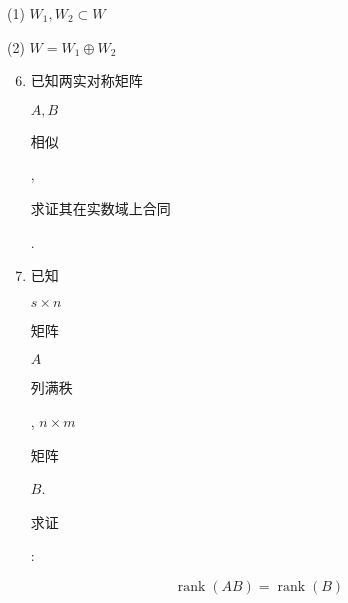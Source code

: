 \documentclass[10pt]{article}
\begin{document}
(1) $W_{1}, W_{2} \subset W$

(2) $W=W_{1} \oplus W_{2}$

\begin{enumerate}
  \setcounter{enumi}{5}
  \item \begin{CJK}{UTF8}{mj}已知两实对称矩阵\end{CJK} $A, B$ \begin{CJK}{UTF8}{mj}相似\end{CJK}, \begin{CJK}{UTF8}{mj}求证其在实数域上合同\end{CJK}.

  \item \begin{CJK}{UTF8}{mj}已知\end{CJK} $s \times n$ \begin{CJK}{UTF8}{mj}矩阵\end{CJK} $A$ \begin{CJK}{UTF8}{mj}列满秩\end{CJK}, $n \times m$ \begin{CJK}{UTF8}{mj}矩阵\end{CJK} $B$. \begin{CJK}{UTF8}{mj}求证\end{CJK}:

\end{enumerate}
$$
\operatorname{rank}(A B)=\operatorname{rank}(B)
$$
\end{document}
